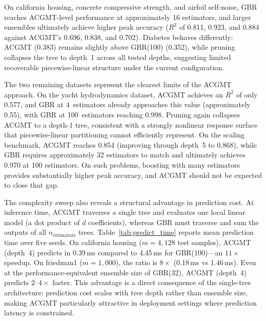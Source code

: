 \documentclass[11pt,a4paper]{article}
\begin{document}
On california housing, concrete compressive strength, and airfoil self-noise, GBR reaches ACGMT-level performance at approximately 16 estimators, and larger ensembles ultimately achieve higher peak accuracy ($R^2$ of 0.811, 0.923, and 0.884 against ACGMT's 0.696, 0.838, and 0.702). Diabetes behaves differently: ACGMT (0.383) remains slightly above GBR(100) (0.352), while pruning collapses the tree to depth~1 across all tested depths, suggesting limited recoverable piecewise-linear structure under the current configuration.

The two remaining datasets represent the clearest limits of the ACGMT approach. On the yacht hydrodynamics dataset, ACGMT achieves an $R^2$ of only 0.577, and GBR at 4~estimators already approaches this value (approximately 0.55), with GBR at 100~estimators reaching 0.998. Pruning again collapses ACGMT to a depth-1 tree, consistent with a strongly nonlinear response surface that piecewise-linear partitioning cannot efficiently represent. On the scaling benchmark, ACGMT reaches 0.854 (improving through depth~5 to 0.868), while GBR requires approximately 32 estimators to match and ultimately achieves 0.970 at 100 estimators. On such problems, boosting with many estimators provides substantially higher peak accuracy, and ACGMT should not be expected to close that gap.

The complexity sweep also reveals a structural advantage in prediction cost. At inference time, ACGMT traverses a single tree and evaluates one local linear model (a dot product of $d$ coefficients), whereas GBR must traverse and sum the outputs of all $n_{\text{estimators}}$ trees. Table~\ref{tab:predict_time} reports mean prediction time over five seeds. On california housing ($m = 4{,}128$ test samples), ACGMT (depth~4) predicts in 0.39\,ms compared to 4.45\,ms for GBR(100)---an $11\times$ speedup. On friedman1 ($m = 1{,}000$), the ratio is $8\times$ (0.18\,ms vs 1.46\,ms). Even at the performance-equivalent ensemble size of GBR(32), ACGMT (depth~4) predicts $2$--$4\times$ faster. This advantage is a direct consequence of the single-tree architecture: prediction cost scales with tree depth rather than ensemble size, making ACGMT particularly attractive in deployment settings where prediction latency is constrained.
\end{document}
